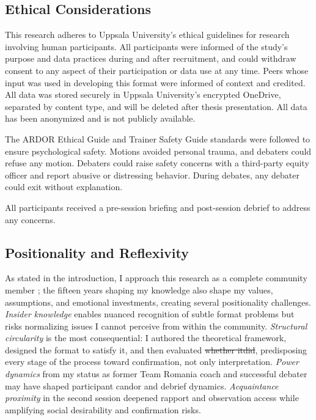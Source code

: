 \documentclass[12pt]{article}
\makeatletter
\providecommand{\DIFaddtex}[1]{{\protect\color[rgb]{0,0.5,0}\uwave{#1}}} %
\providecommand{\DIFdeltex}[1]{{\protect\color{red}\sout{#1}}} %
\providecommand{\DIFaddbegin}{} %
\providecommand{\DIFaddend}{} %
\providecommand{\DIFdelbegin}{} %
\providecommand{\DIFdelend}{} %
\providecommand{\DIFadd}[1]{\texorpdfstring{\DIFaddtex{#1}}{#1}} %
\providecommand{\DIFdel}[1]{\texorpdfstring{\DIFdeltex{#1}}{}} %
\providecommand{\DIFscaledelfig}{0.5}
\newlength{\DIFdelgraphicswidth} %
\newlength{\DIFdelgraphicsheight} %
\providecommand{\DIFaddincludegraphics}[2][]{{\color[rgb]{0,0.5,0}\fbox{\DIFOincludegraphics[#1]{#2}}}} %
\providecommand{\DIFdelincludegraphics}[2][]{%
\sbox{\DIFdelgraphicsbox}{\DIFOincludegraphics[#1]{#2}}%
\settoboxwidth{\DIFdelgraphicswidth}{\DIFdelgraphicsbox} %
\settoboxtotalheight{\DIFdelgraphicsheight}{\DIFdelgraphicsbox} %
\scalebox{\DIFscaledelfig}{%
\parbox[b]{\DIFdelgraphicswidth}{\usebox{\DIFdelgraphicsbox}\\[-\baselineskip] \rule{\DIFdelgraphicswidth}{0em}}\llap{\resizebox{\DIFdelgraphicswidth}{\DIFdelgraphicsheight}{%
\setlength{\unitlength}{\DIFdelgraphicswidth}%
\begin{picture}(1,1)%
\thicklines\linethickness{2pt} %
{\color[rgb]{1,0,0}\put(0,0){\framebox(1,1){}}}%
{\color[rgb]{1,0,0}\put(0,0){\line( 1,1){1}}}%
{\color[rgb]{1,0,0}\put(0,1){\line(1,-1){1}}}%
\end{picture}%
}\hspace*{3pt}}} %
} %
\DeclareRobustCommand{\DIFaddbegin}{\DIFOaddbegin \let\includegraphics\DIFaddincludegraphics} %
\DeclareRobustCommand{\DIFaddend}{\DIFOaddend \let\includegraphics\DIFOincludegraphics} %
\DeclareRobustCommand{\DIFdelbegin}{\DIFOdelbegin \let\includegraphics\DIFdelincludegraphics} %
\DeclareRobustCommand{\DIFdelend}{\DIFOaddend \let\includegraphics\DIFOincludegraphics} %
\let\sout@orig\sout %
\renewcommand{\sout}[1]{\ifmmode\text{\sout@orig{\ensuremath{#1}}}\else\sout@orig{#1}\fi} %
\makeatother
\begin{document}
\subsection{Ethical Considerations}

This research adheres to Uppsala University's ethical guidelines for research involving human participants. All participants were informed of the study's purpose and data practices during and after recruitment, and could withdraw consent to any aspect of their participation or data use at any time. Peers whose input was used in developing this format were informed of context and credited. All data was stored securely in Uppsala University's encrypted OneDrive, separated by content type, and will be deleted after thesis presentation. All data has been anonymized and is not publicly available.

The ARDOR Ethical Guide and Trainer Safety Guide standards were followed to ensure psychological safety. Motions avoided personal trauma, and debaters could refuse any motion. Debaters could raise safety concerns with a third-party equity officer and report abusive or distressing behavior. During debates, any debater could exit without explanation.

All participants received a pre-session briefing and post-session debrief to address any concerns.

\subsection{Positionality and Reflexivity}

As stated in the introduction, I approach this research as a complete community member \parencite{adler1987membership}; the fifteen years shaping my knowledge also shape my values, assumptions, and emotional investments, creating several positionality challenges. \textit{Insider knowledge} enables nuanced recognition of subtle format problems but risks normalizing issues I cannot perceive from within the community. \textit{Structural circularity} is the most consequential: I authored the theoretical framework, designed the format to satisfy it, and then evaluated \DIFdelbegin \DIFdel{whether itdid}\DIFdelend \DIFaddbegin \DIFadd{it}\DIFaddend , predisposing every stage of the process toward confirmation, not only interpretation. \textit{Power dynamics} from my status as former Team Romania coach and successful debater may have shaped participant candor and debrief dynamics. \textit{Acquaintance proximity} in the second session deepened rapport and observation access while amplifying social desirability and confirmation risks.
\end{document}
